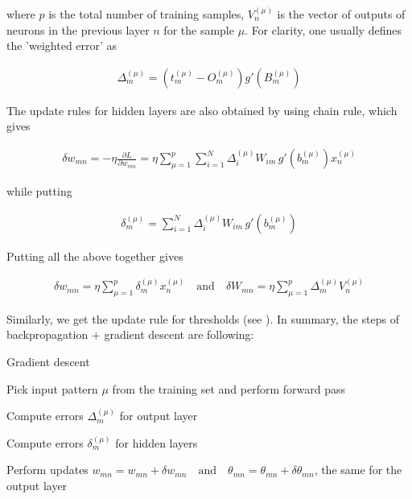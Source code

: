 \noindent where $ p $ is the total number of training samples, $ V_{n}^{(\mu)} $ is the vector of outputs of neurons in the previous layer $ n $ for the sample $ \mu $. For clarity, one usually defines the 'weighted error' as \cite{mehlig}

\begin{gather}
	\Delta_{m}^{(\mu)} = (t_{m}^{(\mu)} - O_{m}^{(\mu)})   g'(B_{m}^{(\mu)})
\end{gather}

\noindent The update rules for hidden layers are also obtained by using chain rule, which gives \cite{mehlig}

\begin{gather}
\delta w_{mn} = - \eta \frac{\partial L}{\partial w_{mn}} = \eta \sum\limits_{\mu=1}^{p} \sum\limits_{i=1}^{N}
\Delta_{i}^{(\mu)} W_{im} \, g'(b_{m}^{(\mu)}) x_{n}^{(\mu)}
\end{gather}

\noindent while putting \cite{mehlig}

\begin{gather}
\delta_{m}^{(\mu)} = \sum\limits_{i=1}^{N} \Delta_{i}^{(\mu)} W_{im} \, g'(b_{m}^{(\mu)})
\end{gather}

\noindent Putting all the above together gives \cite{mehlig}

\begin{gather}
\label{update_rule}
\delta w_{mn} = \eta \sum\limits_{\mu=1}^{p} \delta_{m}^{(\mu)} x_{n}^{(\mu)}
\quad \text{and} \quad 
\delta W_{mn} = \eta \sum\limits_{\mu=1}^{p} \Delta_{m}^{(\mu)} V_{n}^{(\mu)}	
\end{gather}

\noindent Similarly, we get the update rule for thresholds (see \cite{mehlig}). In summary, the steps of backpropagation + gradient descent are following: \cite{mehlig}
\vspace{5mm}
\begin{algorithm}
	\caption{Gradient descent}
	\begin{algorithmic}[1]
		\item Pick input pattern $ \mu $ from the training set and perform forward pass
		\item Compute errors $ \Delta_{m}^{(\mu)} $ for output layer
		\item Compute errors $ \delta_{m}^{(\mu)} $ for hidden layers
		\item Perform updates $w_{mn} = w_{mn} + \delta w_{mn} \quad \text{and} \quad \theta_{mn} = \theta_{mn} + \delta \theta_{mn}$, the same for the output layer
	\end{algorithmic}
\end{algorithm}

